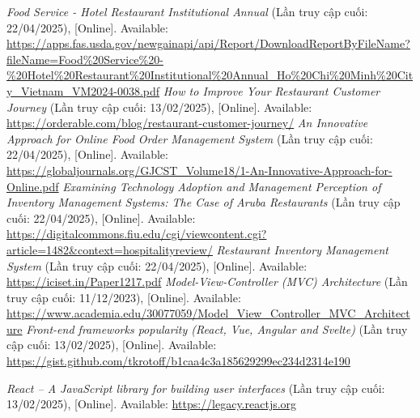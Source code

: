 \documentclass[12pt, a4paper]{article}
\begin{document}
% 
% 
% 

\newpage
% 
% 
\newpage






\newpage

\renewcommand{\refname}{\textbf{TÀI LIỆU THAM KHẢO}}
\begin{thebibliography}{}
 \textit{Food Service - Hotel Restaurant Institutional Annual
} (Lần truy cập cuối: 22/04/2025), [Online]. Available: \url{https://apps.fas.usda.gov/newgainapi/api/Report/DownloadReportByFileName?fileName=Food\%20Service%20-\%20Hotel\%20Restaurant%20Institutional\%20Annual_Ho\%20Chi\%20Minh\%20City_Vietnam_VM2024-0038.pdf}
 \textit{How to Improve Your Restaurant Customer Journey
} (Lần truy cập cuối: 13/02/2025), [Online]. Available: \url{https://orderable.com/blog/restaurant-customer-journey/}
 \textit{An Innovative Approach for Online Food Order Management System} (Lần truy cập cuối: 22/04/2025), [Online]. Available: \url{https://globaljournals.org/GJCST_Volume18/1-An-Innovative-Approach-for-Online.pdf}
 \textit{Examining Technology Adoption and Management Perception of Inventory Management Systems: The Case of Aruba Restaurants
} (Lần truy cập cuối: 22/04/2025), [Online]. Available: \url{https://digitalcommons.fiu.edu/cgi/viewcontent.cgi?article=1482&context=hospitalityreview/}
 \textit{Restaurant Inventory Management System
} (Lần truy cập cuối: 22/04/2025), [Online]. Available: \url{https://iciset.in/Paper1217.pdf}
 \textit{Model-View-Controller (MVC) Architecture} (Lần truy cập cuối: 11/12/2023), [Online]. Available: \url{https://www.academia.edu/30077059/Model_View_Controller_MVC_Architecture}
 \textit{Front-end frameworks popularity (React, Vue, Angular and Svelte)} (Lần truy cập cuối: 13/02/2025), [Online]. Available: \url{https://gist.github.com/tkrotoff/b1caa4c3a185629299ec234d2314e190}

 \textit{React – A JavaScript library for building user interfaces} (Lần truy cập cuối: 13/02/2025), [Online]. Available: \url{https://legacy.reactjs.org}


\end{thebibliography}
\end{document}
